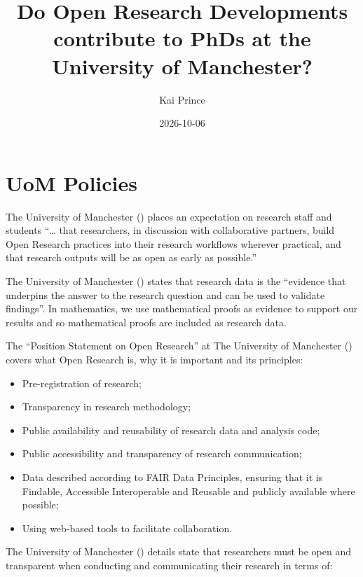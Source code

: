 \documentclass[
  british,
]{article}
\title{Do Open Research Developments contribute to PhDs at the
University of Manchester?}
\author{Kai Prince}
\date{2026-10-06}
\providecommand{\tightlist}{%
  \setlength{\itemsep}{0pt}\setlength{\parskip}{0pt}}
\begin{document}
\maketitle


\section{UoM Policies}\label{uom-policies}

The University of Manchester
() places an expectation on
research staff and students ``\ldots{} that researchers, in discussion
with collaborative partners, build Open Research practices into their
research workflows wherever practical, and that research outputs will be
as open as early as possible.''

The University of Manchester
() states that research
data is the ``evidence that underpins the answer to the research
question and can be used to validate findings''. In mathematics, we use
mathematical proofs as evidence to support our results and so
mathematical proofs are included as research data.

The ``Position Statement on Open Research'' at The University of
Manchester () covers what
Open Research is, why it is important and its principles:

\begin{itemize}
\tightlist
\item
  Pre-registration of research;
\item
  Transparency in research methodology;
\item
  Public availability and reusability of research data and analysis
  code;
\item
  Public accessibility and transparency of research communication;
\item
  Data described according to FAIR Data Principles, ensuring that it is
  Findable, Accessible Interoperable and Reusable and publicly available
  where possible;
\item
  Using web-based tools to facilitate collaboration.
\end{itemize}

The University of Manchester ()
details state that researchers must be open and transparent when
conducting and communicating their research in terms of:
\end{document}
